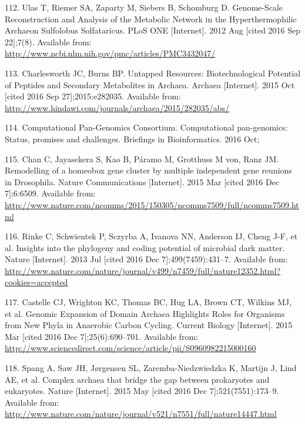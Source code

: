 \documentclass[12pt,twoside]{reedthesis}
\begin{document}
  \hypertarget{ref-ulas_genome-scale_2012}{}
  112. Ulas T, Riemer SA, Zaparty M, Siebers B, Schomburg D. Genome-Scale
  Reconstruction and Analysis of the Metabolic Network in the
  Hyperthermophilic Archaeon Sulfolobus Solfataricus. PLoS ONE
  {[}Internet{]}. 2012 Aug {[}cited 2016 Sep 22{]};7(8). Available from:
  \url{http://www.ncbi.nlm.nih.gov/pmc/articles/PMC3432047/}
  
  \hypertarget{ref-charlesworth_untapped_2015}{}
  113. Charlesworth JC, Burns BP. Untapped Resources: Biotechnological
  Potential of Peptides and Secondary Metabolites in Archaea. Archaea
  {[}Internet{]}. 2015 Oct {[}cited 2016 Sep 27{]};2015:e282035. Available
  from: \url{http://www.hindawi.com/journals/archaea/2015/282035/abs/}
  
  \hypertarget{ref-computational_pan-genomics_consortium_computational_2016}{}
  114. Computational Pan-Genomics Consortium. Computational pan-genomics:
  Status, promises and challenges. Briefings in Bioinformatics. 2016 Oct;
  
  \hypertarget{ref-chan_remodelling_2015}{}
  115. Chan C, Jayasekera S, Kao B, Páramo M, Grotthuss M von, Ranz JM.
  Remodelling of a homeobox gene cluster by multiple independent gene
  reunions in Drosophila. Nature Communications {[}Internet{]}. 2015 Mar
  {[}cited 2016 Dec 7{]};6:6509. Available from:
  \url{http://www.nature.com/ncomms/2015/150305/ncomms7509/full/ncomms7509.html}
  
  \hypertarget{ref-rinke_insights_2013}{}
  116. Rinke C, Schwientek P, Sczyrba A, Ivanova NN, Anderson IJ, Cheng
  J-F, et al. Insights into the phylogeny and coding potential of
  microbial dark matter. Nature {[}Internet{]}. 2013 Jul {[}cited 2016 Dec
  7{]};499(7459):431--7. Available from:
  \url{http://www.nature.com/nature/journal/v499/n7459/full/nature12352.html?cookies=accepted}
  
  \hypertarget{ref-castelle_genomic_2015}{}
  117. Castelle CJ, Wrighton KC, Thomas BC, Hug LA, Brown CT, Wilkins MJ,
  et al. Genomic Expansion of Domain Archaea Highlights Roles for
  Organisms from New Phyla in Anaerobic Carbon Cycling. Current Biology
  {[}Internet{]}. 2015 Mar {[}cited 2016 Dec 7{]};25(6):690--701.
  Available from:
  \url{http://www.sciencedirect.com/science/article/pii/S0960982215000160}
  
  \hypertarget{ref-spang_complex_2015}{}
  118. Spang A, Saw JH, Jørgensen SL, Zaremba-Niedzwiedzka K, Martijn J,
  Lind AE, et al. Complex archaea that bridge the gap between prokaryotes
  and eukaryotes. Nature {[}Internet{]}. 2015 May {[}cited 2016 Dec
  7{]};521(7551):173--9. Available from:
  \url{http://www.nature.com/nature/journal/v521/n7551/full/nature14447.html}
  
\end{document}
